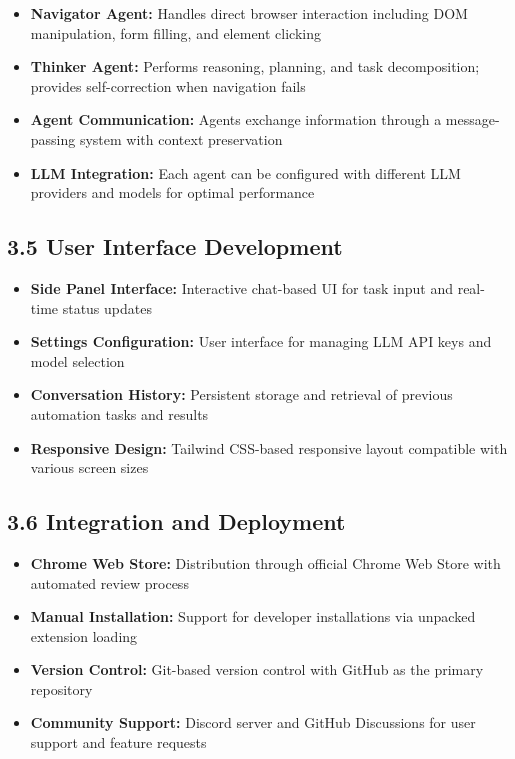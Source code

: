 \documentclass[12pt,a4paper]{article}
\begin{document}
\begin{itemize}
    \item \textbf{Navigator Agent:} Handles direct browser interaction including DOM manipulation, form filling, and element clicking
    
    \item \textbf{Thinker Agent:} Performs reasoning, planning, and task decomposition; provides self-correction when navigation fails
    
    \item \textbf{Agent Communication:} Agents exchange information through a message-passing system with context preservation
    
    \item \textbf{LLM Integration:} Each agent can be configured with different LLM providers and models for optimal performance
\end{itemize}

\subsection*{\textbf{3.5 User Interface Development}}

\begin{itemize}
    \item \textbf{Side Panel Interface:} Interactive chat-based UI for task input and real-time status updates
    
    \item \textbf{Settings Configuration:} User interface for managing LLM API keys and model selection
    
    \item \textbf{Conversation History:} Persistent storage and retrieval of previous automation tasks and results
    
    \item \textbf{Responsive Design:} Tailwind CSS-based responsive layout compatible with various screen sizes
\end{itemize}

\subsection*{\textbf{3.6 Integration and Deployment}}

\begin{itemize}
    \item \textbf{Chrome Web Store:} Distribution through official Chrome Web Store with automated review process
    
    \item \textbf{Manual Installation:} Support for developer installations via unpacked extension loading
    
    \item \textbf{Version Control:} Git-based version control with GitHub as the primary repository
    
    \item \textbf{Community Support:} Discord server and GitHub Discussions for user support and feature requests
\end{itemize}
\end{document}
